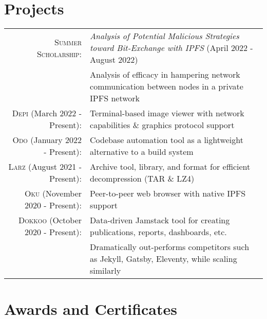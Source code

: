 \documentclass[letterpaper,8pt]{article} %
\begin{document}

\section{Projects}

\begin{tabular}{rl}
\footnotesize\textsc{Summer Scholarship}: & \footnotesize\emph{Analysis of Potential Malicious Strategies toward Bit-Exchange with IPFS} \footnotesize{(April 2022 - August 2022)}\\
& \footnotesize{Analysis of efficacy in hampering network communication between nodes in a private IPFS network}\\
\textsc{Depi} \footnotesize{(March 2022 - Present)}: & \footnotesize{Terminal-based image viewer with network capabilities \& graphics protocol support}\\
\textsc{Odo} \footnotesize{(January 2022 - Present)}: & \footnotesize{Codebase automation tool as a lightweight alternative to a build system}\\
\textsc{Larz} \footnotesize{(August 2021 - Present)}: & \footnotesize{Archive tool, library, and format for efficient decompression (TAR \& LZ4)}\\
\textsc{Oku} \footnotesize{(November 2020 - Present)}: & \footnotesize{Peer-to-peer web browser with native IPFS support}\\
\textsc{Dokkoo} \footnotesize{(October 2020 - Present)}: & \footnotesize{Data-driven Jamstack tool for creating publications, reports, dashboards, etc.}\\
& \footnotesize{Dramatically out-performs competitors such as Jekyll, Gatsby, Eleventy, while scaling similarly}
\end{tabular}


\section{Awards and Certificates}
\end{document}
